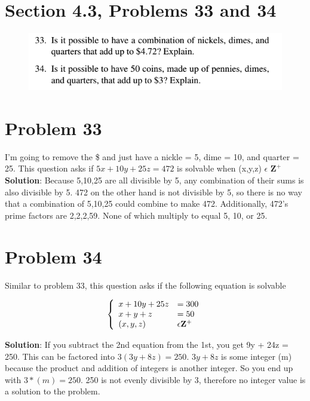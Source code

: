 \documentclass{article}
\author{Spencer Lawry}
\begin{document}
\section*{Section 4.3, Problems 33 and 34}
\begin{figure}[h]
\includegraphics{HW2Prob1}
\centering
\end{figure}
\begin{large}
\section*{Problem 33}
I'm going to remove the \$ and just have a nickle = 5, dime = 10, and quarter = 25. \newline
This question asks if $5x + 10y + 25z = 472$ is solvable when (x,y,z) $\epsilon$ $\mathbf{Z}^+$
\newline\newline 
\textbf{Solution}: Because 5,10,25 are all divisible by 5, any combination of their sums is also divisible by 5. 472 on the other hand is not divisible by 5, so there is no way that a combination of 5,10,25 could combine to make 472. 
\newline \newline 
Additionally, 472's prime factors are 2,2,2,59. None of which multiply to equal 5, 10, or 25.

\section*{Problem 34}
Similar to problem 33, this question asks if the following equation is solvable

\begin{align}
\left\{ \begin{array}{ll}
x + 10y + 25z &= 300\\
x + y + z &= 50\\
(x,y,z) &\epsilon \mathbf{Z}^+
\end{array}\right.
\end{align}


\textbf{Solution}: If you subtract the 2nd equation from the 1st, you get 9y + 24z = 250. \newline
This can be factored into $3(3y+8z)=250$. $3y+8z$ is some integer (m) because the product and addition of integers is another integer. So you end up with $3*(m) = 250$. 250 is not evenly divisible by 3, therefore no integer value is a solution to the problem. 


\end{large}
\end{document}
